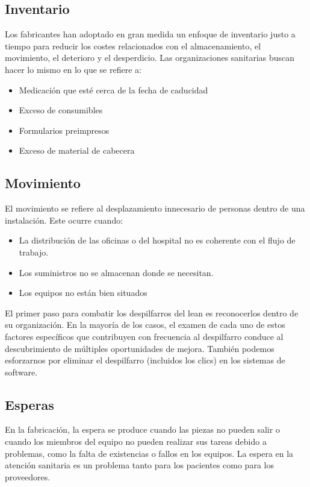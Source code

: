 \subsection{Inventario}

Los fabricantes han adoptado en gran medida un enfoque de inventario justo a tiempo para reducir los costes relacionados con el almacenamiento, el movimiento, el deterioro y el desperdicio. Las organizaciones sanitarias buscan hacer lo mismo en lo que se refiere a:

\begin{itemize}
    \item Medicación que esté cerca de la fecha de caducidad
    \item Exceso de consumibles
    \item Formularios preimpresos
    \item Exceso de material de cabecera
\end{itemize}

\subsection{Movimiento}

El movimiento se refiere al desplazamiento innecesario de personas dentro de una instalación. Este ocurre cuando:

\begin{itemize}
    \item La distribución de las oficinas o del hospital no es coherente con el flujo de trabajo.
    \item Los suministros no se almacenan donde se necesitan.
    \item Los equipos no están bien situados
\end{itemize}

El primer paso para combatir los despilfarros del lean es reconocerlos dentro de su organización. En la mayoría de los casos, el examen de cada uno de estos factores específicos que contribuyen con frecuencia al despilfarro conduce al descubrimiento de múltiples oportunidades de mejora. También podemos esforzarnos por eliminar el despilfarro (incluidos los clics) en los sistemas de software.

\subsection{Esperas}

En la fabricación, la espera se produce cuando las piezas no pueden salir o cuando los miembros del equipo no pueden realizar sus tareas debido a problemas, como la falta de existencias o fallos en los equipos. La espera en la atención sanitaria es un problema tanto para los pacientes como para los proveedores.

